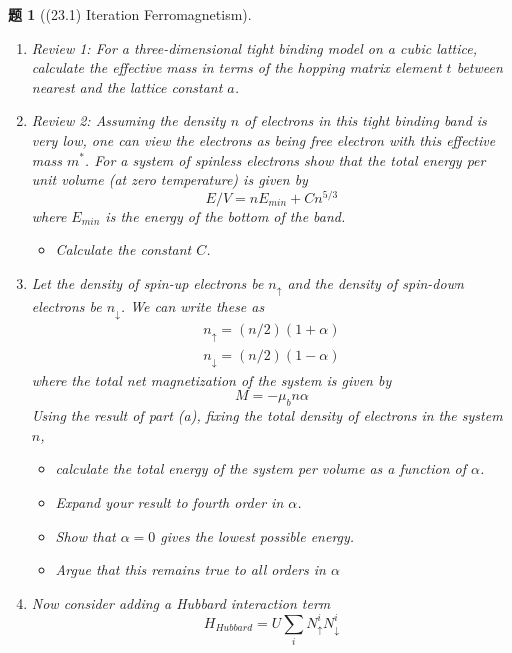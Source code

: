 \documentclass[UTF8,10pt,a4paper]{article}
\theoremstyle{Problem}
\newtheorem{prob}{题}
\theoremstyle{Solution}
\begin{document}
\begin{prob}[(23.1) Iteration Ferromagnetism]
    \begin{enumerate}
        \item[(a.i)]  Review 1: For a three-dimensional tight binding model on a cubic lattice, calculate the effective mass in terms of the hopping matrix element $t$ between nearest and the lattice constant $a$.
        \item[(a.ii)] Review 2: Assuming the density $n$ of electrons in this tight binding band is very low, one can view the electrons as being free electron with this effective mass $m^*$. For a system of spinless electrons show that the total energy per unit volume (at zero temperature) is given by
        \[
            E/V=nE_{min}+Cn^{5/3}
        \]
        where $E_{min}$ is the energy of the bottom of the band.
        \begin{itemize}
            \item[$\triangleright$] Calculate the constant $C$.
        \end{itemize}
        \item[(b)] Let the density of spin-up electrons be $n_{\uparrow}$ and the density of spin-down electrons be $n_{\downarrow}$. We can write these as
        \begin{gather}
            n_{\uparrow}=(n/2)(1+\alpha)\tag{23.6}\\
            n_{\downarrow}=(n/2)(1-\alpha)\tag{23.7}
        \end{gather}
        where the total net magnetization of the system is given by
        \[
            M=-\mu_bn\alpha
        \]
        Using the result of part (a), fixing the total density of electrons in the system $n$,
        \begin{itemize}
            \item[$\triangleright$] calculate the total energy of the system per volume as a function of $\alpha$.
            \item[$\triangleright$] Expand your result to fourth order in $\alpha$.
            \item[$\triangleright$] Show that $\alpha=0$ gives the lowest possible energy.
            \item[$\triangleright$] Argue that this remains true to all orders in $\alpha$
        \end{itemize}
        \item[(c)] Now consider adding a Hubbard interaction term
        \[
            H_{Hubbard}=U\sum_iN_{\uparrow}^iN_{\downarrow}^i
\]
\end{enumerate}
\end{prob}
\end{document}
